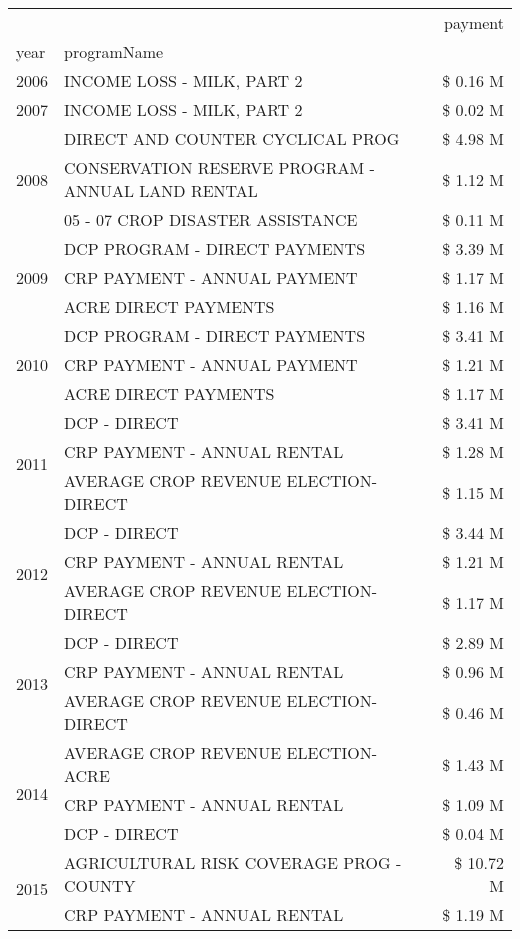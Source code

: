 \begin{tabular}{llr}
\toprule
 &  & payment \\
year & programName &  \\
\midrule
2006 & INCOME LOSS - MILK, PART 2 & \$ 0.16 M \\
\cline{1-3}
2007 & INCOME LOSS - MILK, PART 2 & \$ 0.02 M \\
\cline{1-3}
\multirow[t]{3}{*}{2008} & DIRECT AND COUNTER CYCLICAL PROG & \$ 4.98 M \\
 & CONSERVATION RESERVE PROGRAM - ANNUAL LAND RENTAL & \$ 1.12 M \\
 & 05 - 07 CROP DISASTER ASSISTANCE & \$ 0.11 M \\
\cline{1-3}
\multirow[t]{3}{*}{2009} & DCP PROGRAM - DIRECT PAYMENTS & \$ 3.39 M \\
 & CRP PAYMENT - ANNUAL PAYMENT & \$ 1.17 M \\
 & ACRE DIRECT PAYMENTS & \$ 1.16 M \\
\cline{1-3}
\multirow[t]{3}{*}{2010} & DCP PROGRAM - DIRECT PAYMENTS & \$ 3.41 M \\
 & CRP PAYMENT - ANNUAL PAYMENT & \$ 1.21 M \\
 & ACRE DIRECT PAYMENTS & \$ 1.17 M \\
\cline{1-3}
\multirow[t]{3}{*}{2011} & DCP - DIRECT & \$ 3.41 M \\
 & CRP PAYMENT - ANNUAL RENTAL & \$ 1.28 M \\
 & AVERAGE CROP REVENUE ELECTION-DIRECT & \$ 1.15 M \\
\cline{1-3}
\multirow[t]{3}{*}{2012} & DCP - DIRECT & \$ 3.44 M \\
 & CRP PAYMENT - ANNUAL RENTAL & \$ 1.21 M \\
 & AVERAGE CROP REVENUE ELECTION-DIRECT & \$ 1.17 M \\
\cline{1-3}
\multirow[t]{3}{*}{2013} & DCP - DIRECT & \$ 2.89 M \\
 & CRP PAYMENT - ANNUAL RENTAL & \$ 0.96 M \\
 & AVERAGE CROP REVENUE ELECTION-DIRECT & \$ 0.46 M \\
\cline{1-3}
\multirow[t]{3}{*}{2014} & AVERAGE CROP REVENUE ELECTION-ACRE & \$ 1.43 M \\
 & CRP PAYMENT - ANNUAL RENTAL & \$ 1.09 M \\
 & DCP - DIRECT & \$ 0.04 M \\
\cline{1-3}
\multirow[t]{3}{*}{2015} & AGRICULTURAL RISK COVERAGE PROG - COUNTY & \$ 10.72 M \\
 & CRP PAYMENT - ANNUAL RENTAL & \$ 1.19 M \\

\end{tabular}
